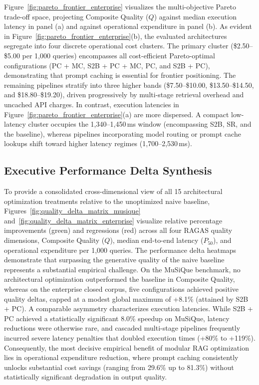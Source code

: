 Figure~\ref{fig:pareto_frontier_enterprise} visualizes the multi-objective Pareto trade-off space, projecting Composite Quality ($Q$) against median execution latency in panel (a) and against operational expenditure in panel (b). As evident in Figure~\ref{fig:pareto_frontier_enterprise}(b), the evaluated architectures segregate into four discrete operational cost clusters. The primary cluster (\$2.50--\$5.00 per 1,000 queries) encompasses all cost-efficient Pareto-optimal configurations (PC + MC, S2B + PC + MC, PC, and S2B + PC), demonstrating that prompt caching is essential for frontier positioning. The remaining pipelines stratify into three higher bands (\$7.50--\$10.00, \$13.50--\$14.50, and \$18.80--\$19.20), driven progressively by multi-stage retrieval overhead and uncached API charges. In contrast, execution latencies in Figure~\ref{fig:pareto_frontier_enterprise}(a) are more dispersed. A compact low-latency cluster occupies the 1,340--1,450\,ms window (encompassing S2B, SR, and the baseline), whereas pipelines incorporating model routing or prompt cache lookups shift toward higher latency regimes (1,700--2,530\,ms). 

\FloatBarrier
\subsection{Executive Performance Delta Synthesis}
\label{subsec:results_delta_heatmap}

To provide a consolidated cross-dimensional view of all 15 architectural optimization treatments relative to the unoptimized naive baseline, Figures~\ref{fig:quality_delta_matrix_musique} and~\ref{fig:quality_delta_matrix_enterprise} visualize relative percentage improvements (green) and regressions (red) across all four RAGAS quality dimensions, Composite Quality ($Q$), median end-to-end latency ($P_{50}$), and operational expenditure per 1,000 queries. The performance delta heatmaps demonstrate that surpassing the generative quality of the naive baseline represents a substantial empirical challenge. On the MuSiQue benchmark, no architectural optimization outperformed the baseline in Composite Quality, whereas on the enterprise closed corpus, five configurations achieved positive quality deltas, capped at a modest global maximum of +8.1\% (attained by S2B + PC). A comparable asymmetry characterizes execution latencies. While S2B + PC achieved a statistically significant 8.0\% speedup on MuSiQue, latency reductions were otherwise rare, and cascaded multi-stage pipelines frequently incurred severe latency penalties that doubled execution times (+80\% to +119\%). Consequently, the most decisive empirical benefit of modular RAG optimization lies in operational expenditure reduction, where prompt caching consistently unlocks substantial cost savings (ranging from 29.6\% up to 81.3\%) without statistically significant degradation in output quality.

